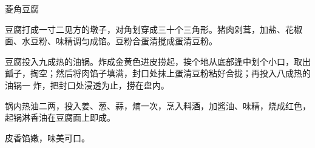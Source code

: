 %
%
%
%
%
%
%
\begin{recipe}{菱角豆腐}

\ingredients


\preparation

\step 豆腐打成一寸二见方的墩子，对角划穿成三十个三角形。猪肉剁茸，加盐、花椒
面、水豆粉、味精调匀成馅。豆粉合蛋清搅成蛋清豆粉。

\step 豆腐投入九成热的油锅。炸成金黄色进皮捞起，挨个地从底部逢中划个小口，取出
瓤子，掏空；然后将肉馅子填满，封口处抹上蛋清豆粉粘好合拢；再投入八成热的油锅一
炸，把封口处浸透为止，捞在盘内。

\step 锅内热油二两，投入姜、葱、蒜，煵一次，烹入料酒，加酱油、味精，烧成红色，
起锅淋香油在豆腐面上即成。

\features

皮香馅嫩，味美可口。

\end{recipe}

